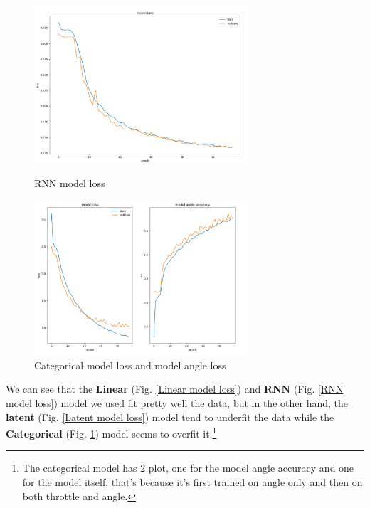 \begin{figure}[!h]
\begin{minipage}{8cm}
\centering
\includegraphics[width=8cm]{img/model_bench/rnn.png}
\caption{RNN model loss}
\label{RNN model loss}
\end{minipage}
\hspace*{1cm}
\begin{minipage}{8cm}
\centering
\includegraphics[width=8cm]{img/model_bench/categorical.png}
\caption{Categorical model loss and model angle loss}
\label{Categorical model loss}
\end{minipage}
\end{figure}

We can see that the \textbf{Linear} (Fig. \ref{Linear model loss}) and \textbf{RNN} (Fig.  \ref{RNN model loss}) model we used fit pretty well the data, but in the other hand, the \textbf{latent} (Fig. \ref{Latent model loss}) model tend to underfit the data while the \textbf{Categorical} (Fig. \ref{Categorical model loss}) model seems to overfit it.\footnote{The categorical model has 2 plot, one for the model angle accuracy and one for the model itself, that's because it's first trained on angle only and then on both throttle and angle.} \\

